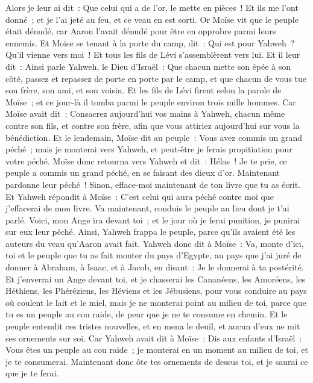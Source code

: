 \begin{multicols}{2}
Alors je leur ai dit~: Que celui qui a de l'or, le mette en pièces~! Et ils me l'ont donné~; et je l'ai jeté au feu, et ce veau en est sorti.
Or Moïse vit que le peuple était dénudé, car Aaron l'avait dénudé pour être en opprobre parmi leurs ennemis.
Et Moïse se tenant à la porte du camp, dit~: Qui est pour Yahweh~? Qu'il vienne vers moi~! Et tous les fils de Lévi s'assemblèrent vers lui.
Et il leur dit~: Ainsi parle Yahweh, le Dieu d'Israël~: Que chacun mette son épée à son côté, passez et repassez de porte en porte par le camp, et que chacun de vous tue son frère, son ami, et son voisin.
Et les fils de Lévi firent selon la parole de Moïse~; et ce jour-là il tomba parmi le peuple environ trois mille hommes.
Car Moïse avait dit~: Consacrez aujourd'hui vos mains à Yahweh, chacun même contre son fils, et contre son frère, afin que vous attiriez aujourd'hui sur vous la bénédiction.
Et le lendemain, Moïse dit au peuple~: Vous avez commis un grand péché~; mais je monterai vers Yahweh, et peut-être je ferais propitiation pour votre péché.
Moïse donc retourna vers Yahweh et dit~: Hélas~! Je te prie, ce peuple a commis un grand péché, en se faisant des dieux d'or.
Maintenant pardonne leur péché~! Sinon, efface-moi maintenant de ton livre que tu as écrit.
Et Yahweh répondit à Moïse~: C'est celui qui aura péché contre moi que j'effacerai de mon livre.
Va maintenant, conduis le peuple au lieu dont je t'ai parlé. Voici, mon Ange ira devant toi~; et le jour où je ferai punition, je punirai sur eux leur péché.
 Ainsi, Yahweh frappa le peuple, parce qu'ils avaient été les auteurs du veau qu'Aaron avait fait.
\VerseOne{}Yahweh donc dit à Moïse~: Va, monte d'ici, toi et le peuple que tu as fait monter du pays d'Egypte, au pays que j'ai juré de donner à Abraham, à Isaac, et à Jacob, en disant~: Je le donnerai à ta postérité.
Et j'enverrai un Ange devant toi, et je chasserai les Cananéens, les Amoréens, les Héthiens, les Phéréziens, les Héviens et les Jébusiens,
pour vous conduire au pays où coulent le lait et le miel, mais je ne monterai point au milieu de toi, parce que tu es un peuple au cou raide, de peur que je ne te consume en chemin.
Et le peuple entendit ces tristes nouvelles, et en mena le deuil, et aucun d'eux ne mit ses ornements sur soi.
Car Yahweh avait dit à Moïse~: Dis aux enfants d'Israël~: Vous êtes un peuple au cou raide~; je monterai en un moment au milieu de toi, et je te consumerai. Maintenant donc ôte tes ornements de dessus toi, et je saurai ce que je te ferai.

\end{multicols}
